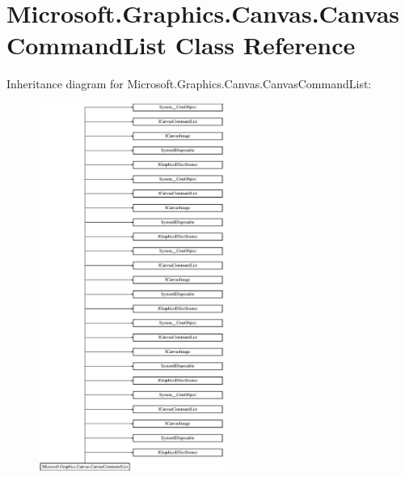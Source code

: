\hypertarget{class_microsoft_1_1_graphics_1_1_canvas_1_1_canvas_command_list}{}\section{Microsoft.\+Graphics.\+Canvas.\+Canvas\+Command\+List Class Reference}
\label{class_microsoft_1_1_graphics_1_1_canvas_1_1_canvas_command_list}
Inheritance diagram for Microsoft.\+Graphics.\+Canvas.\+Canvas\+Command\+List\+:\begin{figure}[H]
\begin{center}
\leavevmode
\includegraphics[height=12.000000cm]{class_microsoft_1_1_graphics_1_1_canvas_1_1_canvas_command_list}
\end{center}
\end{figure}
